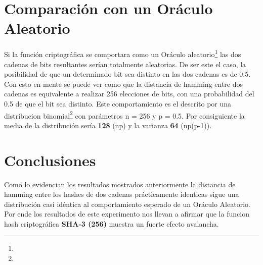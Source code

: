 \documentclass[a4paper]{article}
\begin{document}
\section{Comparación con un Oráculo Aleatorio}

Si la función criptográfica se comportara como un Oráculo aleatorio\footnote{}
las dos cadenas de bits resultantes serían totalmente aleatorias. De ser este el caso, la posibilidad de que un determinado
bit sea distinto en las dos cadenas es de 0.5. Con esto en mente se puede ver como que la distancia de hamming entre dos cadenas es 
equivalente a realizar 256 elecciones de bits, con una probabilidad del 0.5 de que el bit sea distinto. Este comportamiento
es el descrito por una distribucion binomial\footnote{} con parámetros
n = 256 y p = 0.5. Por consiguiente la media de la distribución sería \textbf{128} (np) y la varianza \textbf{64} (np(p-1)).

\section{Conclusiones}

Como lo evidencian los resultados mostrados anteriormente la distancia de hamming entre los hashes de dos cadenas 
prácticamente identicas sigue una distribución casi idéntica al comportamiento esperado de un Oráculo Aleatorio. Por 
ende los resultados de este experimento nos llevan a afirmar que la funcion hash criptográfica \textbf{SHA-3 (256)} 
muestra un fuerte efecto avalancha. 
\end{document}

